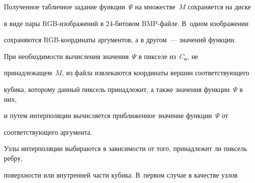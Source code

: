 




Полученное табличное задание функции~$\Psi$ на множестве~$M$ сохраняется на диске


в виде пары RGB-изображений в 24-би\-то\-вом BMP-файле. В~одном изображении


сохраняются RGB-ко\-ор\-ди\-на\-ты аргументов, а в другом~--- значений функции.





При необходимости вычисления значения~$\Psi$ в пикселе из~$C_{\mathrm{и}}$, не


принадлежащем~$M$, из файла извлекаются координаты вершин соответствующего


кубика, которому данный пиксель принадлежит, а также значения функции~$\Psi$ в них,


и путем интерполяции вычисляется приближенное значение функции~$\Psi$ от\linebreak


соответствующего аргумента.





Узлы интерполяции выбираются в зависимости от того, принадлежит ли пиксель ребру,


поверхности или внутренней части кубика. В~первом случае в качестве узлов


